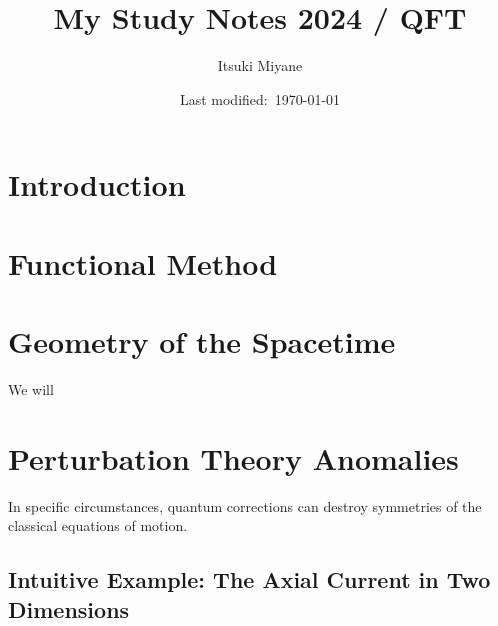 \documentclass[a4paper,pdftex,11pt]{article}
\title{My Study Notes 2024 / QFT}
\author{Itsuki Miyane}
\date{Last modified:\ \today}
\begin{document}
\maketitle

\tableofcontents

\clearpage
\section{Introduction}
















\clearpage
\section{Functional Method}

















\clearpage
\section{Geometry of the Spacetime}

We will

























\clearpage
\section{Perturbation Theory Anomalies}

In specific circumstances, quantum corrections can destroy symmetries of the classical equations of motion.

\subsection{Intuitive Example: The Axial Current in Two Dimensions}
\end{document}
